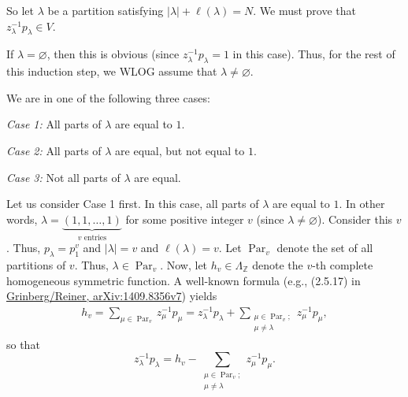 \documentclass[10pt,a4paper]{article}
\begin{document}
So let $\lambda$ be a partition satisfying $\left\vert \lambda\right\vert
+\ell\left(  \lambda\right)  =N$. We must prove that $z_{\lambda}
^{-1}p_{\lambda}\in V$.




If $\lambda=\varnothing$, then this is obvious (since $z_{\lambda}
^{-1}p_{\lambda}=1$ in this case). Thus, for the rest of this induction step,
we WLOG assume that $\lambda\neq\varnothing$.




We are in one of the following three cases:




\emph{Case 1:} All parts of $\lambda$ are equal to $1$.




\emph{Case 2:} All parts of $\lambda$ are equal, but not equal to $1$.




\emph{Case 3:} Not all parts of $\lambda$ are equal.




Let us consider Case 1 first. In this case, all parts of $\lambda$ are equal
to $1$. In other words, $\lambda=\underbrace{\left(  1,1,\ldots,1\right)
}_{v\text{ entries}}$ for some positive integer $v$ (since $\lambda
\neq\varnothing$). Consider this $v$. Thus, $p_{\lambda}=p_{1}^v $ and
$\left\vert \lambda\right\vert =v$ and $\ell\left(  \lambda\right)  =v$.
Let $\operatorname{Par}_{v}$ denote the set of all
partitions of $v$. Thus, $\lambda\in\operatorname{Par}_{v}$. Now, let $h_v \in \Lambda_{\mathbb{Z}}$ denote the $v$-th complete homogeneous symmetric function. A
well-known formula (e.g., (2.5.17) in \href{https://arxiv.org/abs/1409.8356v7}{Grinberg/Reiner, arXiv:1409.8356v7})
yields
\begin{align*}
h_{v}=\sum_{\mu\in\operatorname{Par}_{v}}z_{\mu}^{-1}p_{\mu
}=z_{\lambda}^{-1}p_{\lambda}+\sum_{\substack{\mu\in\operatorname{Par}_{v};
\\\mu\neq\lambda}}z_{\mu}^{-1}p_{\mu},
\end{align*}
so that
\begin{equation}
z_{\lambda}^{-1}p_{\lambda}=h_v -\sum_{\substack{\mu\in
\operatorname{Par}_{v};\\\mu\neq\lambda}}z_{\mu}^{-1}p_{\mu}.
\label{darij1.pf.t2.c1.2}
\tag{1}
\end{equation}
\end{document}
